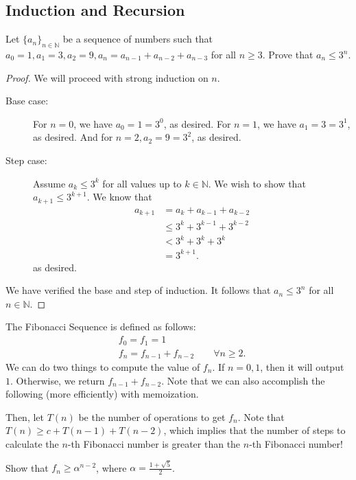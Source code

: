 \documentclass[a4paper]{article}
\begin{document}
\subsection{Induction and Recursion}

\begin{eg}
	Let \( \{a_n\}_{n \in \mathbb{N}} \) be a sequence of numbers such that \( a_{0}=1, a_{1}=3, a_{2}=9, a_n=a_{n-1} + a_{n-2} + a_{n-3}\) for all \( n \ge 3 \). Prove that \( a_n \le 3^n \).
\end{eg}

\begin{proof}
	We will proceed with strong induction on \( n \).
	\begin{description}
		\item[Base case:] For \( n=0 \), we have \( a_0=1=3^0 \), as desired. For \( n=1 \), we have \( a_1=3=3^1 \), as desired. And for \( n=2, a_2=9=3^2 \), as desired.
		\item[Step case:] Assume \( a_k \le 3^k \) for all values up to \( k \in \mathbb{N} \). We wish to show that \( a_{k+1}\le 3^{k+1}  \). We know that 
			\begin{align*}
				a_{k+1} &= a_k+a_{k-1}+a_{k-2} \\
								&\le 3^k + 3^{k-1} + 3^{k-2} \tag {Follows from inductive hypothesis} \\
								&< 3^k+3^k+3^k \\
								&= 3^{k+1}
			.\end{align*}
			as desired.
	\end{description}
	We have verified the base and step of induction. It follows that \( a_n \le 3^n \) for all \( n \in \mathbb{N} \).
\end{proof}


\begin{eg}
	The Fibonacci Sequence is defined as follows:
	\begin{align*}
		&f_{0}=f_{1}=1 \\
		&f_n=f_{n-1}+f_{n-2} \qquad \forall n\ge 2
	.\end{align*}
	We can do two things to compute the value of \( f_n \). If \( n=0,1 \), then it will output \( 1 \). Otherwise, we return \( f_{n-1}+f_{n-2} \). Note that we can also accomplish the following (more efficiently) with memoization.

	Then, let \( T(n) \) be the number of operations to get \( f_n \). Note that \( T(n) \ge  c+ T(n-1) + T(n-2) \), which implies that the number of steps to calculate the \( n \)-th Fibonacci number is greater than the \( n \)-th Fibonacci number!

	Show that \( f_n \ge \alpha ^{n-2}  \), where \( \alpha =\frac{1+\sqrt{5} }{2} \).
\end{eg}
\end{document}
